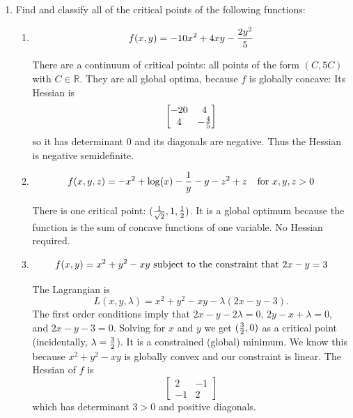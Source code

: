 \documentclass[11pt]{article}
\begin{document}
\begin{enumerate}
\begin{enumerate}
\item Find the rank of 
$$\begin{bmatrix} 
1& 1& 5\\
0& 2& 4\\
-2& 0& -6\\
1& 9& 21
\end{bmatrix}$$

It is 2.


\end{enumerate}

\vspace{.2in}
\newpage 
\item Find and classify all of the critical points of the following functions:

\begin{enumerate}

\item  $$f(x, y)=-10x^2+4xy-{{2y^2}\over 5}$$

There are a continuum of critical points: all points of the form $(C, 5C)$ with $C\in \mathbb{R}$.  They are all global optima, because $f$ is globally concave: Its Hessian is $$\begin{bmatrix}-20 & 4\\4& -{4\over 5}\end{bmatrix}$$ so it has determinant 0 and its diagonals are negative.  Thus the Hessian is negative semidefinite.

\item $$f(x, y, z)=-x^2+{\log}(x)-{1\over y}-y-z^2+z \hspace{.1in}\hbox{ for }x, y, z>0$$

 There is one critical point: $({1\over \sqrt{2}}, 1, {1\over 2})$.  It is a global optimum because the function is the sum of concave functions of one variable.  No Hessian required.

\item $$f(x, y)=x^2+y^2-xy \hbox{ subject to the constraint that }2x-y=3$$

The Lagrangian is $$L(x, y, \lambda)=x^2+y^2-xy-\lambda(2x-y-3).$$  The first order conditions imply that $2x-y-2\lambda=0$, $2y-x+\lambda=0$, and $2x-y-3=0$.  Solving for $x$ and $y$ we get $({3\over 2},0)$ as a critical point (incidentally, $\lambda={3\over 2}$).  It is a constrained (global) minimum.  We know this because $x^2+y^2-xy$ is globally convex and our constraint is linear. The Hessian of $f$ is $$\begin{bmatrix}2& -1\\-1& 2\end{bmatrix}$$ which has determinant $3>0$ and positive diagonals. 
\end{enumerate}

\end{enumerate}
\end{document}
